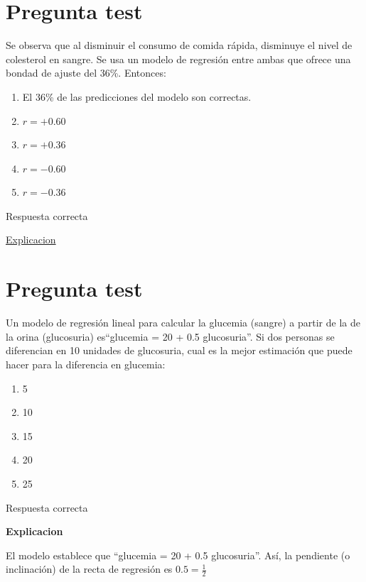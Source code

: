 \documentclass[
]{book}
\providecommand{\tightlist}{%
  \setlength{\itemsep}{0pt}\setlength{\parskip}{0pt}}
\begin{document}
\hypertarget{pregunta-test-132}{%
\section{Pregunta test}\label{pregunta-test-132}}

Se observa que al disminuir el consumo de comida rápida, disminuye el nivel de colesterol en sangre. Se usa un modelo de regresión entre ambas que ofrece una bondad de ajuste del 36\%. Entonces:

\begin{enumerate}
\def\labelenumi{\alph{enumi})}
\tightlist
\item
  El 36\% de las predicciones del modelo son correctas.
\item
  \(r= +0.60\)
\item
  \(r= +0.36\)
\item
  \(r= -0.60\)
\item
  \(r= -0.36\)
\end{enumerate}

Respuesta correcta

\href{https://es.wikipedia.org/wiki/Coeficiente_de_determinación}{Explicacion}

\hypertarget{pregunta-test-133}{%
\section{Pregunta test}\label{pregunta-test-133}}

Un modelo de regresión lineal para calcular la glucemia (sangre) a partir de la de la orina (glucosuria) es``glucemia = 20 + 0.5 glucosuria''. Si dos personas se diferencian en 10 unidades de glucosuria, cual es la mejor estimación que puede hacer para la diferencia en glucemia:

\begin{enumerate}
\def\labelenumi{\alph{enumi})}
\tightlist
\item
  5
\item
  10
\item
  15
\item
  20
\item
  25
\end{enumerate}

Respuesta correcta

\textbf{Explicacion}

El modelo establece que ``glucemia = 20 + 0.5 glucosuria''. Así, la pendiente (o inclinación) de la recta de regresión es \(0.5 = \frac{1}{2}\)
\end{document}
